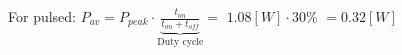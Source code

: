 \documentclass[preview]{standalone}
\begin{document}
\begin{center}
For pulsed: $P_{av} = P_{peak} \cdot $$\underbrace{\frac{t_{on}}{t_{on}+t_{off}}}_{\text{Duty cycle}}=$ $1.08 [W] \cdot $$30 \%$ $=$$0.32 [W]$
\end{center}
\end{document}
